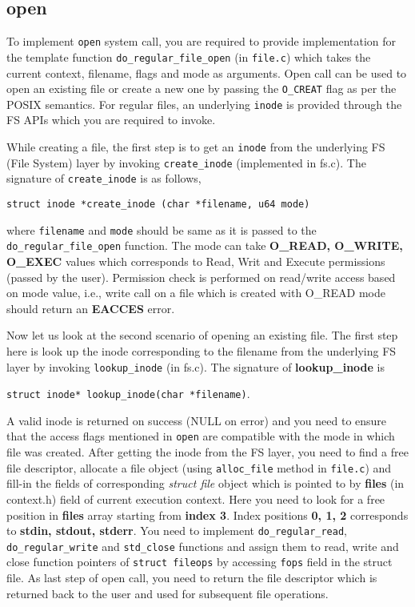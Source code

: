 \documentclass[12pt]{article}
\begin{document}
\subsection{open}
To implement {\tt open} system call, you are required to provide implementation for the template function  
{\tt do\_regular\_file\_open} (in {\tt file.c}) which takes the current context, filename, flags and mode as arguments. 
Open call can be used to open an existing file or create a new one by passing the {\tt O\_CREAT} flag as per the POSIX semantics.
For regular files, an underlying {\tt inode} is provided through the FS APIs which you are required to invoke.


\noindent While creating a file, the first step is to get an {\tt inode} from the underlying FS (File System) layer by 
invoking {\tt create\_inode} (implemented in fs.c). 
The signature of {\tt create\_inode} is as follows,

\vspace{0.25cm}
\noindent
{\tt struct inode *create\_inode (char *filename, u64 mode)} 
\vspace{0.25cm}

\noindent
where {\tt filename} and {\tt mode} should be same as it is passed to the {\tt do\_regular\_file\_open} function. The mode can take \textbf{O\_READ, O\_WRITE, O\_EXEC} 
values which corresponds to Read, Writ and  Execute permissions (passed by the user). Permission check is performed on read/write access based on mode value, i.e., 
write call on a file which is created with O\_READ mode should return an \textbf{EACCES} error.


Now let us look at the second scenario of opening an existing file. 
The first step here is look up the inode corresponding to the filename from the underlying FS layer by invoking {\tt lookup\_inode} (in fs.c). 
The signature of \textbf{lookup\_inode} is 

\vspace{0.25cm}
\noindent
{\tt struct inode* lookup\_inode(char *filename)}. 
\vspace{0.25cm}

A valid inode is returned on success (NULL on error) and you need to ensure that the access flags mentioned in {\tt open}
are compatible with the mode in which file was created. After getting the inode from the FS layer, you need to find a free file
descriptor, allocate a file object (using {\tt alloc\_file} method in {\tt file.c}) and fill-in the fields of 
corresponding {\em struct file} object which is pointed to by \textbf{files} (in context.h) field of current execution context. 
Here you need to look for a free position in \textbf{files} array 
starting from \textbf{index 3}. Index positions \textbf{0, 1, 2} corresponds to \textbf{stdin, stdout, stderr}.
%
You need to implement 
{\tt do\_regular\_read}, {\tt do\_regular\_write} and {\tt std\_close} functions and assign them to read, write and close function 
pointers of {\tt struct fileops} by accessing {\tt fops} field in the struct file.
%
As last step of open call, you need to return the file descriptor which is returned back to the user and used for
subsequent file operations.
\end{document}
